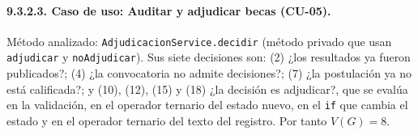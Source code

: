 \paragraph{9.3.2.3. Caso de uso: Auditar y adjudicar becas (CU-05).}

Método analizado: \texttt{AdjudicacionService.decidir} (método privado que usan \texttt{adjudicar} y \texttt{noAdjudicar}). Sus siete decisiones son: (2) ¿los resultados ya fueron publicados?; (4) ¿la convocatoria no admite decisiones?; (7) ¿la postulación ya no está calificada?; y (10), (12), (15) y (18) ¿la decisión es adjudicar?, que se evalúa en la validación, en el operador ternario del estado nuevo, en el \texttt{if} que cambia el estado y en el operador ternario del texto del registro. Por tanto $V(G)=8$.

